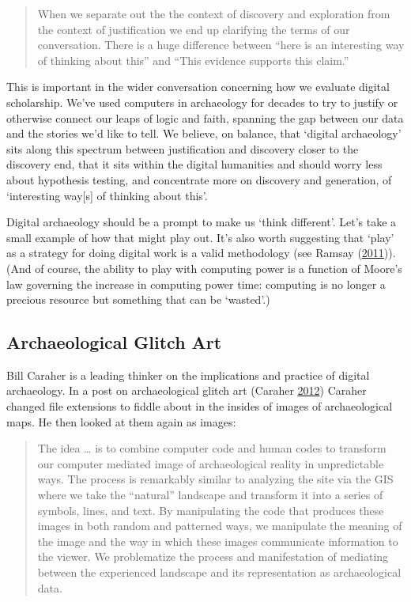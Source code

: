 \documentclass[english,]{book}
\begin{document}
\begin{quote}
When we separate out the the context of discovery and exploration from
the context of justification we end up clarifying the terms of our
conversation. There is a huge difference between ``here is an
interesting way of thinking about this'' and ``This evidence supports
this claim.''
\end{quote}

This is important in the wider conversation concerning how we evaluate
digital scholarship. We've used computers in archaeology for decades to
try to justify or otherwise connect our leaps of logic and faith,
spanning the gap between our data and the stories we'd like to tell. We
believe, on balance, that `digital archaeology' sits along this spectrum
between justification and discovery closer to the discovery end, that it
sits within the digital humanities and should worry less about
hypothesis testing, and concentrate more on discovery and generation, of
`interesting way{[}s{]} of thinking about this'.

Digital archaeology should be a prompt to make us `think different'.
Let's take a small example of how that might play out. It's also worth
suggesting that `play' as a strategy for doing digital work is a valid
methodology (see Ramsay
(\protect\hyperlink{ref-ramsay_reading_2011}{2011})). (And of course,
the ability to play with computing power is a function of Moore's law
governing the increase in computing power time: computing is no longer a
precious resource but something that can be `wasted'.)

\subsection{Archaeological Glitch Art}\label{archaeological-glitch-art}

Bill Caraher is a leading thinker on the implications and practice of
digital archaeology. In a post on archaeological glitch art (Caraher
\protect\hyperlink{ref-caraher_archaeological_2012}{2012}) Caraher
changed file extensions to fiddle about in the insides of images of
archaeological maps. He then looked at them again as images:

\begin{quote}
The idea \ldots{} is to combine computer code and human codes to
transform our computer mediated image of archaeological reality in
unpredictable ways. The process is remarkably similar to analyzing the
site via the GIS where we take the ``natural'' landscape and transform
it into a series of symbols, lines, and text. By manipulating the code
that produces these images in both random and patterned ways, we
manipulate the meaning of the image and the way in which these images
communicate information to the viewer. We problematize the process and
manifestation of mediating between the experienced landscape and its
representation as archaeological data.
\end{quote}
\end{document}
